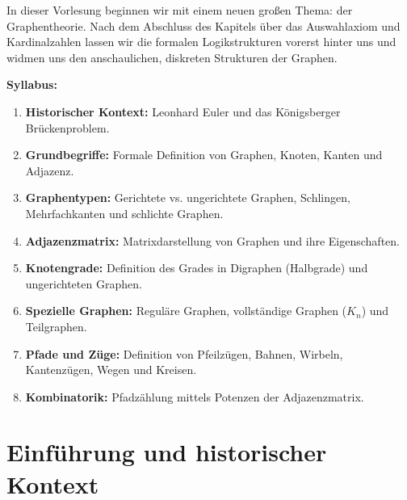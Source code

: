 

\begin{nice-box}
In dieser Vorlesung beginnen wir mit einem neuen großen Thema: der Graphentheorie. Nach dem Abschluss des Kapitels über das Auswahlaxiom und Kardinalzahlen lassen wir die formalen Logikstrukturen vorerst hinter uns und widmen uns den anschaulichen, diskreten Strukturen der Graphen.

\textbf{Syllabus:}
\begin{enumerate}[label=\textbf{(\arabic*)}]
    \item \textbf{Historischer Kontext:} Leonhard Euler und das Königsberger Brückenproblem.
    \item \textbf{Grundbegriffe:} Formale Definition von Graphen, Knoten, Kanten und Adjazenz.
    \item \textbf{Graphentypen:} Gerichtete vs. ungerichtete Graphen, Schlingen, Mehrfachkanten und schlichte Graphen.
    \item \textbf{Adjazenzmatrix:} Matrixdarstellung von Graphen und ihre Eigenschaften.
    \item \textbf{Knotengrade:} Definition des Grades in Digraphen (Halbgrade) und ungerichteten Graphen.
    \item \textbf{Spezielle Graphen:} Reguläre Graphen, vollständige Graphen ($K_n$) und Teilgraphen.
    \item \textbf{Pfade und Züge:} Definition von Pfeilzügen, Bahnen, Wirbeln, Kantenzügen, Wegen und Kreisen.
    \item \textbf{Kombinatorik:} Pfadzählung mittels Potenzen der Adjazenzmatrix.
\end{enumerate}
\end{nice-box}

\section{Einführung und historischer Kontext}

